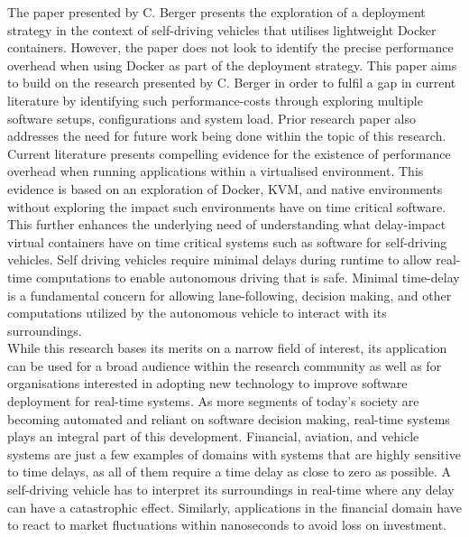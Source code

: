 The paper presented by C. Berger \cite{cberger} presents the exploration of a deployment strategy in the context of self-driving vehicles that utilises lightweight Docker containers. However, the paper does not look to identify the precise performance overhead when using Docker as part of the deployment strategy. This paper aims to build on the research presented by C. Berger in order to fulfil a gap in current literature by identifying such performance-costs through exploring multiple software setups, configurations and system load. Prior research paper \cite{cberger} also addresses the need for future work being done within the topic of this research.\\

Current literature \cite{vmvscontainers} presents compelling evidence for the existence of performance overhead when running applications within a virtualised environment. This evidence is based on an exploration of Docker, KVM, and native environments without exploring the impact such environments have on time critical software. This further enhances the underlying need of understanding what delay-impact virtual containers have on time critical systems such as software for self-driving vehicles. Self driving vehicles require minimal delays during runtime to allow real-time computations to enable autonomous driving that is safe. Minimal time-delay is a fundamental concern for allowing lane-following, decision making, and other computations utilized by the autonomous vehicle to interact with its surroundings.\\

While this research bases its merits on a narrow field of interest, its application can be used for a broad audience within the research community as well as for organisations interested in adopting new technology to improve software deployment for real-time systems. As more segments of today's society are becoming automated and reliant on software decision making, real-time systems plays an integral part of this development. Financial, aviation, and vehicle systems are just a few examples of domains with systems that are highly sensitive to time delays, as all of them require a time delay as close to zero as possible. A self-driving vehicle has to interpret its surroundings in real-time where any delay can have a catastrophic effect. Similarly, applications in the financial domain have to react to market fluctuations within nanoseconds to avoid loss on investment.\\


